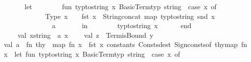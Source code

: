 \begin{isabellebody}
\ \ \ \ \ \ let\isanewline
\ \ \ \ \ \ \ \ fun\ typ{\isacharunderscore}{\kern0pt}to{\isacharunderscore}{\kern0pt}string\ {\isacharparenleft}{\kern0pt}x{\isacharcolon}{\kern0pt}\ Basic{\isacharunderscore}{\kern0pt}Term{\isachardot}{\kern0pt}typ{\isacharparenright}{\kern0pt}{\isacharcolon}{\kern0pt}\ string\ {\isacharequal}{\kern0pt}\ case\ x\ of\isanewline
\ \ \ \ \ \ \ \ \ \ \ \ Type\ x\ {\isacharequal}{\kern0pt}{\isachargreater}{\kern0pt}\ {\isachardoublequote}{\kern0pt}{\isacharparenleft}{\kern0pt}{\isachardoublequote}{\kern0pt}\ {\isacharcircum}{\kern0pt}\ {\isacharparenleft}{\kern0pt}fst\ x{\isacharparenright}{\kern0pt}\ {\isacharcircum}{\kern0pt}\ String{\isachardot}{\kern0pt}concat\ {\isacharparenleft}{\kern0pt}map\ {\isacharparenleft}{\kern0pt}typ{\isacharunderscore}{\kern0pt}to{\isacharunderscore}{\kern0pt}string{\isacharparenright}{\kern0pt}\ {\isacharparenleft}{\kern0pt}snd\ x{\isacharparenright}{\kern0pt}{\isacharparenright}{\kern0pt}\ {\isacharcircum}{\kern0pt}\ {\isachardoublequote}{\kern0pt}{\isacharparenright}{\kern0pt}{\isachardoublequote}{\kern0pt}\isanewline
\ \ \ \ \ \ \ \ \ \ {\isacharbar}{\kern0pt}\ \ {\isacharunderscore}{\kern0pt}\ {\isacharequal}{\kern0pt}{\isachargreater}{\kern0pt}\ {\isachardoublequote}{\kern0pt}{\isacharparenleft}{\kern0pt}{\isacharquery}{\kern0pt}{\isacharprime}{\kern0pt}a{\isacharparenright}{\kern0pt}{\isachardoublequote}{\kern0pt}\isanewline
\ \ \ \ \ \ \ in\isanewline
\ \ \ \ \ \ \ \ typ{\isacharunderscore}{\kern0pt}to{\isacharunderscore}{\kern0pt}string\ x\isanewline
\ \ \ \ \ \ end\isanewline
\ \ \ \ \ \ \ \isanewline
\ \ \ \ val\ x{\isacharunderscore}{\kern0pt}string{}\ {\isacharequal}{\kern0pt}\ a\ x\isanewline
\isanewline
\ \ \ \ val\ z\ {\isacharequal}{\kern0pt}\ Term{\isachardot}{\kern0pt}is{\isacharunderscore}{\kern0pt}Bound\ y\isanewline
\isanewline
\isanewline
\isanewline
val\ a\ {\isacharequal}{\kern0pt}\ fn\ thy\ {\isacharequal}{\kern0pt}{\isachargreater}{\kern0pt}\ {\isacharparenleft}{\kern0pt}{\isacharparenleft}{\kern0pt}map\ {\isacharparenleft}{\kern0pt}fn\ x\ {\isacharequal}{\kern0pt}{\isachargreater}{\kern0pt}\ {\isacharparenleft}{\kern0pt}fst\ x{\isacharparenright}{\kern0pt}{\isacharparenright}{\kern0pt}\ {\isacharparenleft}{\kern0pt}{\isacharhash}{\kern0pt}constants\ {\isacharparenleft}{\kern0pt}Consts{\isachardot}{\kern0pt}dest\ {\isacharparenleft}{\kern0pt}Sign{\isachardot}{\kern0pt}consts{\isacharunderscore}{\kern0pt}of\ thy{\isacharparenright}{\kern0pt}{\isacharparenright}{\kern0pt}{\isacharparenright}{\kern0pt}{\isacharparenright}{\kern0pt}{\isacharcomma}{\kern0pt}map\ {\isacharparenleft}{\kern0pt}fn\ x\ {\isacharequal}{\kern0pt}{\isachargreater}{\kern0pt}\ let\ fun\ typ{\isacharunderscore}{\kern0pt}to{\isacharunderscore}{\kern0pt}string\ {\isacharparenleft}{\kern0pt}x{\isacharcolon}{\kern0pt}\ Basic{\isacharunderscore}{\kern0pt}Term{\isachardot}{\kern0pt}typ{\isacharparenright}{\kern0pt}{\isacharcolon}{\kern0pt}\ string\ {\isacharequal}{\kern0pt}\ case\ x\ of\isanewline

\end{isabellebody}
